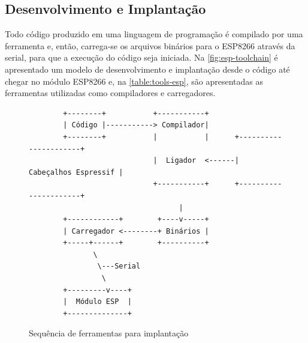 \FloatBarrier
\subsection{Desenvolvimento e Implantação}
\label{subsec:dev-esp}

Todo código produzido em uma linguagem de programação é compilado por uma
ferramenta e, então, carrega-se os arquivos binários para o ESP8266 através da
serial, para que a execução do código seja iniciada. Na
\autoref{fig:esp-toolchain} é apresentado um modelo de desenvolvimento e
implantação desde o código até chegar no módulo ESP8266 e, na
\autoref{table:tools-esp}, são apresentadas as ferramentas utilizadas como
compiladores e carregadores.

\begin{figure}[htb]
	\caption{\label{fig:esp-toolchain}Sequência de ferramentas para implantação}
	\begin{center}
		\begin{verbatim}
		+--------+           +-----------+
		| Código |-----------> Compilador|
		+--------+           |           |      +----------------------+
		                     |  Ligador  <------| Cabeçalhos Espressif |
		                     +-----------+      +----------------------+
		                           |
		+------------+        +----v-----+
		| Carregador <--------+ Binários |
		+-----+------+        +----------+
		       \
		        \---Serial
		         \
		+---------v----+
		|  Módulo ESP  |
		+--------------+
		\end{verbatim}
	\end{center}
\end{figure}

\FloatBarrier

\begin{table}[htb]
\end{table}

